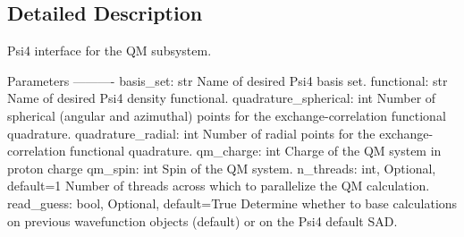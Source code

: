 \subsection{Detailed Description}
\begin{DoxyVerb}Psi4 interface for the QM subsystem.

Parameters
----------
basis_set: str
    Name of desired Psi4 basis set.
functional: str
    Name of desired Psi4 density functional.
quadrature_spherical: int
    Number of spherical (angular and azimuthal) points for the 
    exchange-correlation functional quadrature.
quadrature_radial: int
    Number of radial points for the exchange-correlation functional
    quadrature.
qm_charge: int
    Charge of the QM system in proton charge
qm_spin: int
    Spin of the QM system.
n_threads: int, Optional, default=1
    Number of threads across which to parallelize the QM calculation.
read_guess: bool, Optional, default=True
    Determine whether to base calculations on previous wavefunction
    objects (default) or on the Psi4 default SAD.
\end{DoxyVerb}
 


